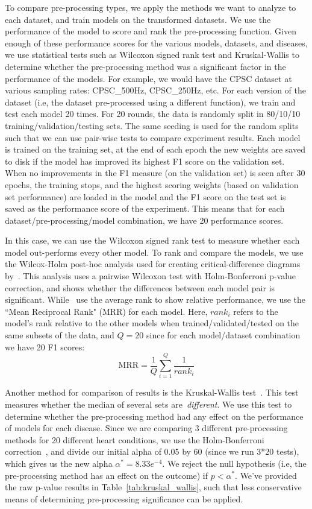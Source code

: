\documentclass[pmlr,twocolumn]{jmlr}%
\begin{document}
To compare pre-processing types, we apply the methods we want to analyze to each dataset, and train models on the transformed datasets. We use the performance of the model to score and rank the pre-processing function. Given enough of these performance scores for the various models, datasets, and diseases, we use statistical tests such as Wilcoxon signed rank test and Kruskal-Wallis to determine whether the pre-processing method was a significant factor in the performance of the models. For example, we would have the CPSC dataset at various sampling rates: CPSC\_500Hz, CPSC\_250Hz, etc. For each version of the dataset (i.e, the dataset pre-processed using a different function), we train and test each model 20 times. For 20 rounds, the data is randomly split in 80/10/10 training/validation/testing sets. The same seeding is used for the random splits such that we can use pair-wise tests to compare experiment results. Each model is trained on the training set, at the end of each epoch the new weights are saved to disk if the model has improved its highest F1 score on the validation set. When no improvements in the F1 measure (on the validation set) is seen after 30 epochs, the training stops, and the highest scoring weights (based on validation set performance) are loaded in the model and the F1 score on the test set is saved as the performance score of the experiment. This means that for each dataset/pre-processing/model combination, we have 20 performance scores. 

In this case, we can use the Wilcoxon signed rank test to measure whether each model out-performs every other model. To rank and compare the models, we use the Wilcox-Holm post-hoc analysis used for creating critical-difference diagrams by~\citet{IsmailFawaz2018deep}. This analysis uses a pairwise Wilcoxon test with Holm-Bonferroni p-value correction, and shows whether the differences between each model pair is significant. While~\citet{IsmailFawaz2018deep} use the average rank to show relative performance, we use the ``Mean Reciprocal Rank" (MRR) for each model. Here, $rank_i$ refers to the model's rank relative to the other models when trained/validated/tested on the same subsets of the data, and $Q=20$ since for each model/dataset combination we have 20 F1 scores:
\[ \text{MRR} = \frac{1}{Q}\sum_{i=1}^{Q}\frac{1}{rank_i} \]

Another method for comparison of results is the Kruskal-Wallis test~\citep{kruskal1952use,ostertagova2014methodology}. This test measures whether the median of several sets are~\textit{different}. We use this test to determine whether the pre-processing method had any effect on the performance of models for each disease. Since we are comparing 3 different pre-processing methods for 20 different heart conditions, we use the Holm-Bonferroni correction~\citep{holm1979simple,abdi2010holm}, and divide our initial alpha of 0.05 by 60 (since we run 3*20 tests), which gives us the new alpha $\alpha^*=8.33e^{-4}$. We reject the null hypothesis (i.e, the pre-processing method has an effect on the outcome) if $p<\alpha^*$. We've provided the raw p-value results in Table~\ref{tab:kruskal_wallis}, such that less conservative means of determining pre-processing significance can be applied.
\end{document}
